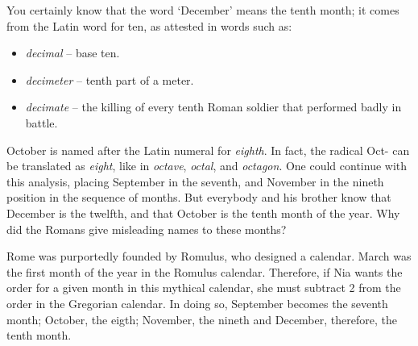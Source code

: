 \documentclass[a4paper,12pt]{book}
\begin{document}
You certainly know that the word `December' means
the tenth month; it comes from the Latin word for
ten, as attested in words such as:
\begin{itemize}
\item {\em decimal} -- base ten.
\item {\em decimeter} -- tenth part of a meter.
\item {\em decimate} -- the killing of every tenth
Roman soldier that performed badly in battle.
\end{itemize}

October is named after the Latin numeral for {\em eighth}.
In fact, the radical {\sc Oct-} can be translated
as {\em eight}, like in
{\em octave}, {\em octal}, and {\em octagon}.
One could continue with this analysis,
placing September in the seventh,
and November in the nineth position
in the sequence of months.
But everybody and
his brother know that December is the
twelfth, and that
October is the tenth month of the
year. Why did the Romans give misleading
names to these months?

Rome was purportedly founded by Romulus,
who designed a calendar.
March was the first month of the year
in the Romulus calendar. Therefore, if Nia
wants the order for a given month in
this mythical calendar, she must
subtract 2 from the order
in the Gregorian calendar.
In doing so, September becomes the
seventh month; October, the eigth;
November, the nineth and
December, therefore, the tenth month.
\end{document}
